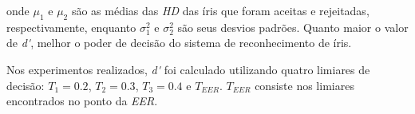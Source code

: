 
\noindent onde $\mu_{1}$ e $\mu_{2}$ são as médias das \textit{\acrshort{HD}} das íris que foram aceitas e rejeitadas, respectivamente, enquanto $\sigma_{1}^2$ e $\sigma_{2}^2$ são seus desvios padrões. Quanto maior o valor de \textit{\acrshort{d'}}, melhor o poder de decisão do sistema de reconhecimento de íris.

\par Nos experimentos realizados, \textit{\acrshort{d'}} foi calculado utilizando quatro limiares de decisão: $T_{1} = 0.2$, $T_{2} = 0.3$, $T_{3} = 0.4$ e $T_{EER}$. $T_{EER}$ consiste nos limiares encontrados no ponto da \textit{\acrshort{EER}}.



